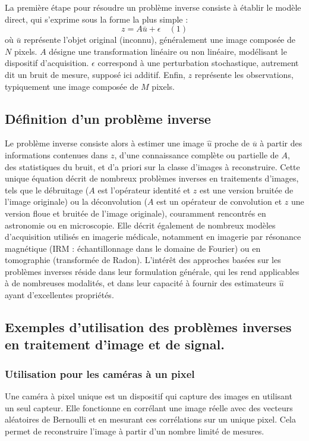 \documentclass[a4paper, 12pt]{report} %
\begin{document}
La première étape pour résoudre un problème inverse consiste à établir le modèle direct, qui s'exprime sous la forme la plus simple :
\[
z = A \bar{u} + \epsilon \quad (1)
\]
où \( \bar{u} \) représente l'objet original (inconnu), généralement une image composée de \( N \) pixels. \( A \) désigne une transformation linéaire ou non linéaire, modélisant le dispositif d'acquisition. \( \epsilon \) correspond à une perturbation stochastique, autrement dit un bruit de mesure, supposé ici additif. Enfin, \( z \) représente les observations, typiquement une image composée de \( M \) pixels.


\subsection{Définition d'un problème inverse}

Le problème inverse consiste alors à estimer une image $\hat{u}$ proche de $\overline{u}$ à partir des informations contenues dans $z$, d'une connaissance complète ou partielle de $A$, des statistiques du bruit, et d'a priori sur la classe d'images à reconstruire. Cette unique équation décrit de nombreux problèmes inverses en traitements d'images, tels que le débruitage ($A$ est l'opérateur identité et $z$ est une version bruitée de l'image originale) ou la déconvolution ($A$ est un opérateur de convolution et $z$ une version floue et bruitée de l'image originale), couramment rencontrés en astronomie ou en microscopie. Elle décrit également de nombreux modèles d'acquisition utilisés en imagerie médicale, notamment en imagerie par résonance magnétique (IRM : échantillonnage dans le domaine de Fourier) ou en tomographie (transformée de Radon). L'intérêt des approches basées sur les problèmes inverses réside dans leur formulation générale, qui les rend applicables à de nombreuses modalités, et dans leur capacité à fournir des estimateurs $\hat{u}$ ayant d'excellentes propriétés.


\subsection{Exemples d'utilisation des problèmes inverses en traitement d'image et de signal.}

\subsubsection{Utilisation pour les caméras à un  pixel}

Une caméra à pixel unique est un dispositif qui capture des images en utilisant un seul capteur. Elle fonctionne en corrélant une image réelle avec des vecteurs aléatoires de Bernoulli et en mesurant ces corrélations sur un unique pixel. Cela permet de reconstruire l'image à partir d'un nombre limité de mesures.
\end{document}
